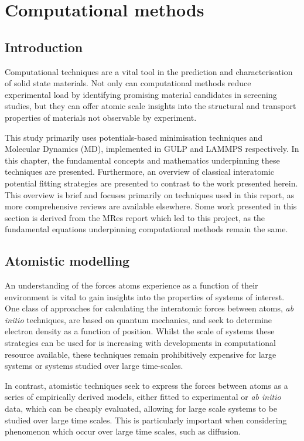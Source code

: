 \chapter{Computational methods}
\section{Introduction} %
Computational techniques are a vital tool in the prediction and characterisation of solid state materials.
Not only can computational methods reduce experimental load by identifying promising material candidates in screening studies, but they can offer atomic scale insights into the structural and transport properties of materials not observable by experiment.

This study primarily uses potentials-based minimisation techniques and Molecular Dynamics (MD), implemented in GULP \cite{Gale2003} and LAMMPS \cite{StevePlimton1995} respectively.
In this chapter, the fundamental concepts and mathematics underpinning these techniques are presented.
Furthermore, an overview of classical interatomic potential fitting strategies are presented to contrast to the work presented herein. %
This overview is brief and focuses primarily on techniques used in this report, as more comprehensive reviews are available elsewhere. \cite{Gale2003, Jensen2007, Catlow2013}
Some work presented in this section is derived from the MRes report which led to this project, as the fundamental equations underpinning computational methods remain the same.

\section{Atomistic modelling}
An understanding of the forces atoms experience as a function of their environment is vital to gain insights into the properties of systems of interest.
One class of approaches for calculating the interatomic forces between atoms, \textit{ab initio} techniques, are based on quantum mechanics, and seek to determine electron density as a function of position. Whilst the scale of systems these strategies can be used for is increasing with developments in computational resource available, these techniques remain prohibitively expensive for large systems or systems studied over large time-scales.

In contrast, atomistic techniques seek to express the forces between atoms as a series of empirically derived models, either fitted to experimental or \textit{ab initio} data, which can be cheaply evaluated, allowing for large scale systems to be studied over large time scales. This is particularly important when considering phenomenon which occur over large time scales, such as diffusion. 

